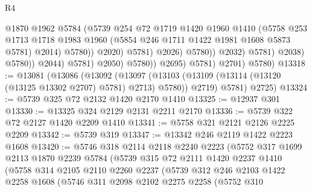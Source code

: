 \begin{lexlean}{R4}
\begin{coremodule}
                                            @1870
                                            @1962
                                            @5784
                                            (@5739
                                              @254
                                              @72
                                              @1719
                                              @1420
                                              @1960
                                              @1410
                                              (@5758
                                                @253
                                                @1713
                                                @1718
                                                @1983
                                                @1960
                                                (@5854 @246 @1711 @1422 @1981 @1608 @5873 @5781)
                                                @2014)
                                              @5780))
                                          @2020)
                                        @5781)
                                      @2026)
                                    @5780))
                                @2032)
                              @5781)
                            @2038)
                          @5780))
                      @2044)
                    @5781)
                  @2050)
                @5780))
            @2695)
          @5781)
        @2701)
      @5780)
@13318 := @13081
    (@13086
      (@13092
        (@13097 (@13103 (@13109 (@13114 (@13120 (@13125 @13302 @2707) @5781) @2713) @5780)) @2719)
        @5781)
      @2725)
@13324 := @5739 @325 @72 @2132 @1420 @2170 @1410
@13325 := @12937 @301
@13330 := @13325 @324 @2129 @2131 @2211 @2170
@13336 := @5739 @322 @72 @2127 @1420 @2209 @1410
@13341 := @5758 @321 @2121 @2126 @2225 @2209
@13342 := @5739 @319
@13347 := @13342 @246 @2119 @1422 @2223 @1608
@13420 := @5746
    @318
    @2114
    @2118
    @2240
    @2223
    (@5752
      @317
      @1699
      @2113
      @1870
      @2239
      @5784
      (@5739
        @315
        @72
        @2111
        @1420
        @2237
        @1410
        (@5758
          @314
          @2105
          @2110
          @2260
          @2237
          (@5739
            @312
            @246
            @2103
            @1422
            @2258
            @1608
            (@5746
              @311
              @2098
              @2102
              @2275
              @2258
              (@5752
                @310

\end{coremodule}
\end{lexlean}
